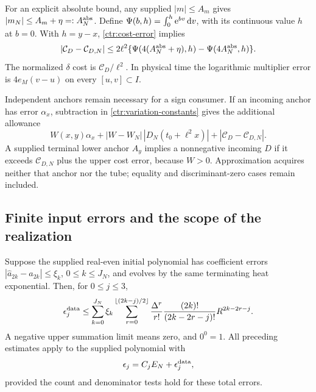 For an explicit absolute bound, any supplied $|m|\le A_m$ gives
$|m_N|\le A_m+\eta=:A_N^{\rm abs}$. Define
$\Psi(b,h)=\int_0^h\mathrm e^{bv}\,\mathrm d v$, with its continuous value $h$
at $b=0$. With $h=y-x$, \eqref{ctr:cost-error} implies
\begin{equation}
 |\mathcal C_D-\mathcal C_{D,N}|
 \le2\ell^2\{
 \Psi(4(A_N^{\rm abs}+\eta),h)-\Psi(4A_N^{\rm abs},h)\}.
 \label{ctr:absolute-cost-error}
\end{equation}
The normalized $\delta$ cost is $\mathcal C_D/\ell^2$.
In physical time the logarithmic multiplier error is
$4e_M(v-u)$ on every $[u,v]\subset I$.

Independent anchors remain necessary for a sign consumer. If an incoming
anchor has error $\alpha_x$, subtraction in
\eqref{ctr:variation-constants} gives the additional allowance
\[
 W(x,y)\alpha_x+|W-W_N|\,|D_N(t_0+\ell^2x)|
                   +|\mathcal C_D-\mathcal C_{D,N}|.
\]
A supplied terminal lower anchor $A_y$ implies a nonnegative incoming
$D$ if it exceeds $\mathcal C_{D,N}$ plus the upper cost error, because
$W>0$. Approximation acquires neither that anchor nor the tube; equality
and discriminant-zero cases remain included.

\subsection{Finite input errors and the scope of the realization}

\begin{proposition}
\label{ctr:data-proposition}
Suppose the supplied real-even initial polynomial has coefficient errors
$|\widehat a_{2k}-a_{2k}|\le\xi_k$, $0\le k\le J_N$, and evolves
by the same terminating heat exponential. Then, for $0\le j\le3$,
\begin{equation}
 \epsilon_j^{\rm data}\le
 \sum_{k=0}^{J_N}\xi_k
 \sum_{r=0}^{\lfloor(2k-j)/2\rfloor}
  \frac{\Delta^r}{r!}\frac{(2k)!}{(2k-2r-j)!}R^{2k-2r-j}.
 \label{ctr:coefficient-data-error}
\end{equation}
A negative upper summation limit means zero, and $0^0=1$.
All preceding estimates apply to the supplied polynomial with
\begin{equation}
 \epsilon_j=C_jE_N+\epsilon_j^{\rm data},
 \label{ctr:total-data-error}
\end{equation}
provided the count and denominator tests hold for these total errors.
\end{proposition}

